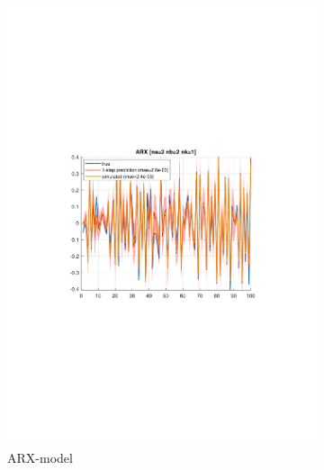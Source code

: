 \documentclass[]{article}
\begin{document}
\begin{figure}[ht]
\centering
\begin{subfigure}{.49\textwidth}
	\centering
	\includegraphics[trim= 10cm 8cm 10cm 8cm, scale=0.4]{figures/2e-ARX-horizon_1.pdf}
	\caption{ARX-model}
	\label{fig:2e-ARX-horizon_1}
\end{subfigure}
\begin{subfigure}{.49\textwidth}
	\centering

\end{subfigure}
\end{figure}
\end{document}
